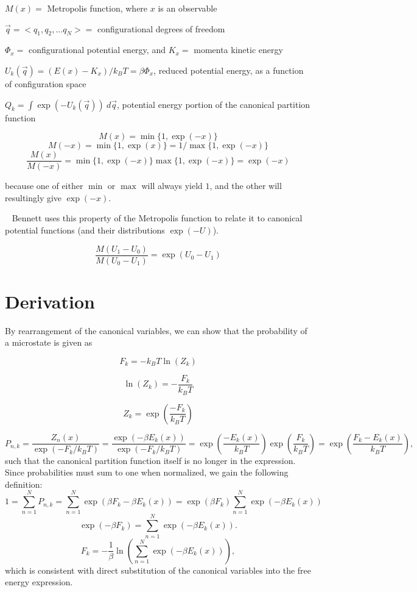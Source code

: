 \documentclass[]{article}
\begin{document}
$M(x) =$ Metropolis function, where $x$ is an observable

$\vec{q} = {<}q_1, q_2, ... q_N{>} =$ configurational degrees of freedom

$\Phi_x =$ configurational potential energy, and $K_x =$ momenta kinetic energy

$U_k(\vec{q}) = (E(x) - K_x)/k_B T = \beta \Phi_x$, reduced potential energy, as a function of configuration space

$Q_k = \int \exp(-U_k(\vec{q}))~d\vec{q}$, potential energy portion of the canonical partition function

\[ M(x) = \min \{ 1, \exp(-x) \} \]
\[ M(-x) = \min \{ 1, \exp(x) \} = 1/ \max \{ 1, \exp(-x) \} \]
\[ \frac{M(x)}{M(-x)} = \min \{ 1, \exp(-x) \} \max \{ 1, \exp(-x) \}  = \exp(-x) \]

because one of either $\min$ or $\max$ will always yield $1$, and the other will resultingly give $\exp(-x)$.

~\linebreak
Bennett uses this property of the Metropolis function to relate it to canonical potential functions (and their distributions $\exp(-U)$).

\[ \frac{M(U_1 - U_0)}{M(U_0 - U_1)} = \exp(U_0 - U_1) \]

\section*{Derivation}

By rearrangement of the canonical variables, we can show that the probability of a microstate\cite{wikiCPF} is given as
\begin{minipage}[b]{0.32\linewidth}
	\[ F_k = -k_B T \ln(Z_k) \]
\end{minipage}
\hfill
\begin{minipage}[b]{0.32\linewidth}
	\[ \ln(Z_k) = -\frac{F_k}{k_B T}  \]
\end{minipage}
\hfill
\begin{minipage}[b]{0.32\linewidth}
	\[ Z_k = \exp \left( \frac{-F_k}{k_B T} \right) \]
\end{minipage}
\[ P_{n,k} = \frac{Z_n(x)}{\exp (-F_k/k_B T)} = \frac{\exp(-\beta E_k(x))}{\exp (-F_k/k_B T)} = \exp\left(\frac{-E_k(x)}{k_B T}\right) \exp \left( \frac{F_k}{k_B T} \right) = \exp\left(\frac{F_k-E_k(x)}{k_B T} \right), \]
such that the canonical partition function itself is no longer in the expression. Since probabilities must sum to one when normalized, we gain the following definition:
\[ 1 = \sum_{n=1}^{N} P_{n,k} = \sum_{n=1}^{N} \exp(\beta F_k - \beta E_k(x)) = \exp(\beta F_k) \sum_{n=1}^{N} \exp(- \beta E_k(x)) \]
\[ \exp(-\beta F_k) = \sum_{n=1}^{N} \exp(- \beta E_k(x)). \]
\[ F_k = -\frac{1}{\beta} \ln \left( \sum_{n=1}^{N} \exp(- \beta E_k(x)) \right), \]
which is consistent with direct substitution of the canonical variables into the free energy expression.
\end{document}
